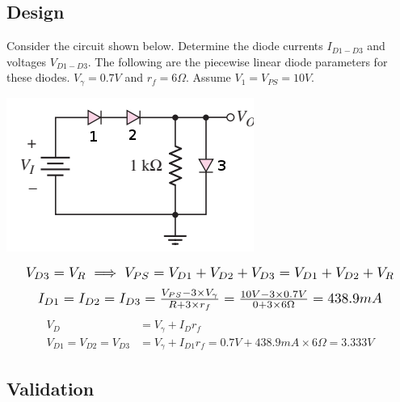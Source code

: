 \documentclass[12pt,letterpaper,titlepage]{article}
\begin{document}
\begin{raggedright}
\subsection{Design}
Consider the circuit shown below. Determine the diode currents $I_{D1-D3}$ and voltages $V_{D1-D3}$. The following are the piecewise linear diode parameters for these diodes. $V_\gamma = 0.7V$ and $r_f = 6\Omega$. Assume $V_1 = V_{PS} = 10V$.
\begin{center}
\includegraphics[width=\textwidth, height=7\baselineskip, keepaspectratio=true]{ds2}
\end{center}

\begin{equation}\scalebox{1.25}{
$
V_{D3} = V_{R} \implies V_{PS} = V_{D1} + V_{D2} + V_{D3} = V_{D1} + V_{D2} + V_{R}
$
}
\end{equation}
\begin{equation}\scalebox{1.25}{
$
I_{D1} = I_{D2} = I_{D3} = \frac{V_{PS} - 3\times V_\gamma}{R + 3\times r_f} = \frac{10V - 3\times 0.7V}{0+ 3\times 6\Omega} = 438.9mA
$
}
\end{equation}
\begin{align}
V_{D} &= V_\gamma + I_D r_f 
\\ V_{D1} = V_{D2} = V_{D3} &= V_\gamma + I_{D1} r_f = 0.7V + 438.9mA \times 6\Omega = 3.333V 
\end{align}

\clearpage
\subsection{Validation}


\end{raggedright}
\end{document}
